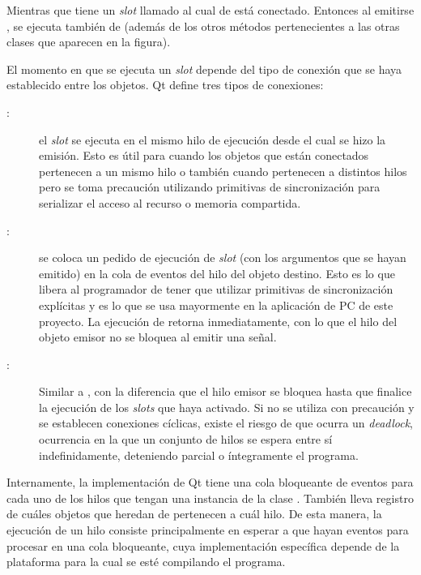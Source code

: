 Mientras que  tiene un \emph{slot} llamado  al cual  de  está conectado. Entonces al emitirse , se ejecuta también  de  (además de los otros métodos pertenecientes a las otras clases que aparecen en la figura).

El momento en que se ejecuta un \emph{slot} depende del tipo de conexión que se haya establecido entre los objetos. Qt define tres tipos de conexiones:
\begin{description}
	\item[:] el \emph{slot} se ejecuta en el mismo hilo de ejecución desde el cual se hizo la emisión. Esto es útil para cuando los objetos que están conectados pertenecen a un mismo hilo o también cuando pertenecen a distintos hilos pero se toma precaución utilizando primitivas de sincronización para serializar el acceso al recurso o memoria compartida.
	\item[:] se coloca un pedido de ejecución de \emph{slot} (con los argumentos que se hayan emitido) en la cola de eventos del hilo del objeto destino. Esto es lo que libera al programador de tener que utilizar primitivas de sincronización explícitas y es lo que se usa mayormente en la aplicación de PC de este proyecto. La ejecución de  retorna inmediatamente, con lo que el hilo del objeto emisor no se bloquea al emitir una señal.
	\item[:] Similar a , con la diferencia que el hilo emisor se bloquea hasta que finalice la ejecución de los \emph{slots} que haya activado. Si no se utiliza con precaución y se establecen conexiones cíclicas, existe el riesgo de que ocurra un \emph{deadlock}, ocurrencia en la que un conjunto de hilos se espera entre sí indefinidamente, deteniendo parcial o íntegramente el programa.
\end{description}

Internamente, la implementación de Qt tiene una cola bloqueante de eventos para cada uno de los hilos que tengan una instancia de la clase . También lleva registro de cuáles objetos que heredan de  pertenecen a cuál hilo. De esta manera, la ejecución de un hilo consiste principalmente en esperar a que hayan eventos para procesar en una cola bloqueante, cuya implementación específica depende de la plataforma para la cual se esté compilando el programa.

